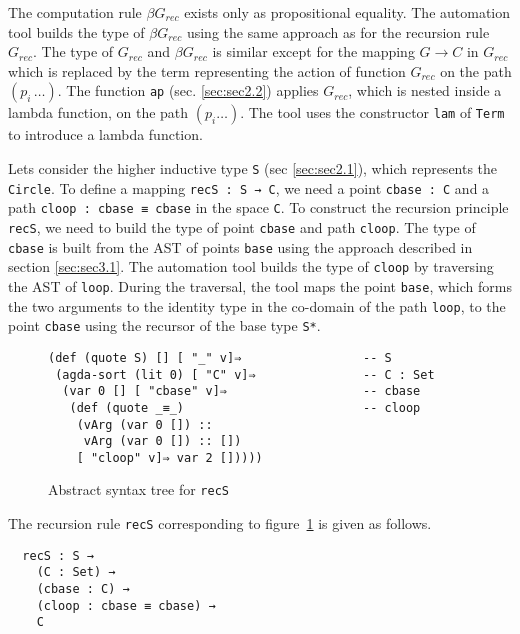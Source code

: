 \documentclass[sigplan,10pt]{acmart}
\begin{document}
The computation rule $\beta G_{rec}$ exists only as propositional equality. The automation tool builds the type of $\beta G_{rec}$ using the same approach as for the recursion rule $G_{rec}$. The type of $G_{rec}$ and $\beta G_{rec}$ is similar except for the mapping $G \to C$ in $G_{rec}$ which is replaced by the term representing the action of function $G_{rec}$ on the path $(p_i \, \ldots)$. The function {\tt ap} (sec. \ref{sec:sec2.2}) applies $G_{rec}$, which is nested inside a lambda function, on the path $(p_i \ldots)$. The tool uses the constructor {\tt lam} of {\tt Term} to introduce a lambda function.

Lets consider the higher inductive type {\tt S} (sec \ref{sec:sec2.1}), which represents the {\tt Circle}. To define a mapping {\tt recS : S → C}, we need a point {\tt cbase : C} and a path {\tt cloop : cbase ≡ cbase} in the space {\tt C}. To construct the recursion principle {\tt recS}, we need to build the type of point {\tt cbase} and path {\tt cloop}. The type of {\tt cbase} is built from the AST of points {\tt base} using the approach described in section \ref{sec:sec3.1}. The automation tool builds the type of {\tt cloop} by traversing the AST of {\tt loop}. During the traversal, the tool maps the point {\tt base}, which forms the two arguments to the identity type in the co-domain of the path {\tt loop}, to the point {\tt cbase} using the recursor of the base type {\tt S*}.

\begin{figure}
\begin{center}
\begingroup
\fontsize{7pt}{9pt}\selectfont
\begin{Verbatim}
(def (quote S) [] [ "_" v]⇒                 -- S
 (agda-sort (lit 0) [ "C" v]⇒               -- C : Set
  (var 0 [] [ "cbase" v]⇒                   -- cbase
   (def (quote _≡_)                         -- cloop
    (vArg (var 0 []) ::
     vArg (var 0 []) :: [])
    [ "cloop" v]⇒ var 2 []))))
\end{Verbatim}
\endgroup
\end{center}
\caption{Abstract syntax tree for {\tt recS}}
\label{fig:ast-f}
\end{figure}
\normalsize

The recursion rule {\tt recS} corresponding to figure~\ref{fig:ast-f} is given as follows.
\begin{center}
\begingroup
\begin{BVerbatim}
  recS : S → 
    (C : Set) →
    (cbase : C) →
    (cloop : cbase ≡ cbase) →
    C
\end{BVerbatim}
\endgroup
\end{center}
\end{document}
